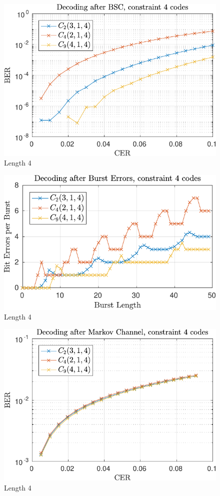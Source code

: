 
\begin{figure}
\centering
\includegraphics[scale=1]{../figures/const4rand.pdf} 
\caption{Length 4}
\end{figure}

\begin{figure}
\centering
\includegraphics[scale=1]{../figures/const4burst.pdf} 
\caption{Length 4}
\end{figure}

\begin{figure}
\centering
\includegraphics[scale=1]{../figures/const4markov.pdf} 
\caption{Length 4}
\end{figure}